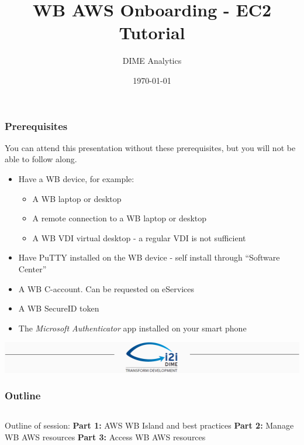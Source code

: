 \documentclass[aspectratio=169]{beamer} %
\title{WB AWS Onboarding - EC2 Tutorial}
\author{DIME Analytics}
\institute{DIME - The World Bank - \trainingURL{https://www.worldbank.org/en/research/dime}}
\date{\today}
\begin{document}
\begin{frame}
	\frametitle{Prerequisites}

		You can attend this presentation without these prerequisites, but you will not be able to follow along.

		\begin{itemize}
			\setlength\itemsep{.8em}
			\item Have a WB device, for example:
			\begin{itemize}
				\item A WB laptop or desktop
				\item A remote connection to a WB laptop or desktop
				\item A WB VDI virtual desktop - a regular VDI is not sufficient
			\end{itemize}
			\item Have PuTTY installed on the WB device - self install through ``Software Center''
			\item A WB C-account. Can be requested on eServices
			\item A WB SecureID token
			\item The \textit{Microsoft Authenticator} app installed on your smart phone
		\end{itemize}
\end{frame}

\begin{frame}
	\includegraphics[width=\textwidth]{img/Header.png}
	\vspace{-0.2cm}
	\titlepage 	 %
\end{frame}

\begin{frame}
	\frametitle{Outline}

	\begin{columns}[c]
		\Huge Outline of session:
		\vspace{.7cm}\newline
		\large \textbf{Part 1:} AWS WB Island and best practices
		\vspace{.7cm}\newline
		\large \textbf{Part 2:} Manage WB AWS resources
		\vspace{.7cm}\newline
		\large \textbf{Part 3:} Access WB AWS resources

	\end{columns}
\end{frame}
\end{document}
